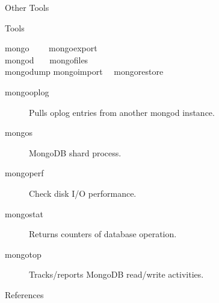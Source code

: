 \documentclass{beamer}
\begin{document}
\begin{frame}{Other Tools}
	\begin{block}{Tools}
		\begin{Alms*}
			mongo ~~~\    mongoexport ~\  ~\  \\
			mongod ~~\    mongofiles ~~\  ~~\  \\
			mongodump     mongoimport ~\ mongorestore  
		\end{Alms*}
	
	\begin{description}
		\item[mongooplog] Pulls oplog entries from another mongod instance.
		\item[mongos] MongoDB shard process.
		\item[mongoperf] Check disk I/O performance.
		\item[mongostat] Returns counters of database operation. 
		\item[mongotop] Tracks/reports MongoDB read/write activities.
	\end{description}
	\end{block}

\end{frame}

\begin{frame}{References}
	\small
    
    
\end{frame}
\end{document}
